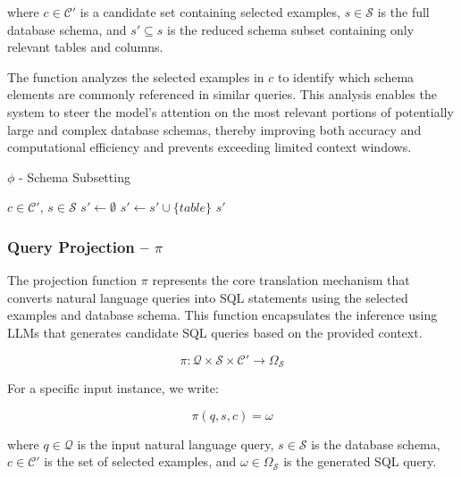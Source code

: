 where $c \in \mathcal{C}'$ is a candidate set containing selected examples, $s \in \mathcal{S}$
is the full database schema, and $s' \subseteq s$ is the reduced schema subset containing
only relevant tables and columns.

The function analyzes the selected examples in $c$ to identify which schema elements
are commonly referenced in similar queries. This analysis enables the system to
steer the model's attention on the most relevant portions of potentially large
and complex database schemas, thereby improving both accuracy and computational
efficiency and prevents exceeding limited context windows.

\begin{algorithm}
\caption{$\phi$ - Schema Subsetting}\label{algorithms:phi}
\begin{algorithmic}[1]
\Require $c \in \mathcal{C}'$, $s \in \mathcal{S}$
\State $s' \gets \emptyset$                          
            
        \State $s' \gets s' \cup \{table\}$          
    \EndIf
\EndFor
\State \Return $s'$                                  
\end{algorithmic}
\end{algorithm}

\subsubsection{Query Projection – $\pi$}\label{design:projection-function}

The projection function $\pi$ represents the core translation mechanism that converts
natural language queries into SQL statements using the selected examples and database
schema. This function encapsulates the inference using LLMs that generates
candidate SQL queries based on the provided context.

$$
\pi: \mathcal{Q} \times \mathcal{S} \times \mathcal{C}' \rightarrow \Omega_{\mathcal{S}}
$$

\vspace{0.5em}

For a specific input instance, we write:

$$
\pi(q, s, c) = \omega
$$

\vspace{0.5em}

where $q \in \mathcal{Q}$ is the input natural language query, $s \in \mathcal{S}$ is
the database schema, $c \in \mathcal{C}'$ is the set of selected examples,
and $\omega \in \Omega_{\mathcal{S}}$ is the generated SQL query.

